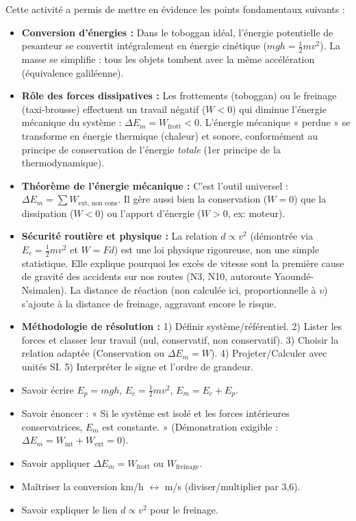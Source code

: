 \documentclass[11pt]{article}
\newcounter{popsec}
\newcounter{popsub}
\newcommand{\courssub}[1]{%
  \stepcounter{popsub}%
  \par\vspace{9pt}\noindent{\popxbold\fontsize{11.5}{13}\selectfont\color{popink}{\color{poporange}\thepopsec.\thepopsub}\hspace{6pt}#1}\par\nopagebreak\vspace{4pt}
}
\begin{document}
\courssub{Bilan de l'activité}
Cette activité a permis de mettre en évidence les points fondamentaux suivants :
\begin{itemize}
    \item \textbf{Conversion d'énergies :} Dans le toboggan idéal, l'énergie potentielle de pesanteur se convertit intégralement en énergie cinétique ($mgh = \frac{1}{2}mv^2$). La masse se simplifie : tous les objets tombent avec la même accélération (équivalence galiléenne).
    \item \textbf{Rôle des forces dissipatives :} Les frottements (toboggan) ou le freinage (taxi-brousse) effectuent un travail négatif ($W < 0$) qui diminue l'énergie mécanique du système : $\Delta E_m = W_{\text{frott}} < 0$. L'énergie mécanique « perdue » se transforme en énergie thermique (chaleur) et sonore, conformément au principe de conservation de l'énergie \emph{totale} (1er principe de la thermodynamique).
    \item \textbf{Théorème de l'énergie mécanique :} C'est l'outil universel : $\Delta E_m = \sum W_{\text{ext, non cons}}$. Il gère aussi bien la conservation ($W=0$) que la dissipation ($W<0$) ou l'apport d'énergie ($W>0$, ex: moteur).
    \item \textbf{Sécurité routière et physique :} La relation $d \propto v^2$ (démontrée via $E_c = \frac{1}{2}mv^2$ et $W = Fd$) est une loi physique rigoureuse, non une simple statistique. Elle explique pourquoi les excès de vitesse sont la première cause de gravité des accidents sur nos routes (N3, N10, autoroute Yaoundé-Nsimalen). La distance de réaction (non calculée ici, proportionnelle à $v$) s'ajoute à la distance de freinage, aggravant encore le risque.
    \item \textbf{Méthodologie de résolution :} 1) Définir système/référentiel. 2) Lister les forces et classer leur travail (nul, conservatif, non conservatif). 3) Choisir la relation adaptée (Conservation ou $\Delta E_m = W$). 4) Projeter/Calculer avec unités SI. 5) Interpréter le signe et l'ordre de grandeur.
\end{itemize}
\begin{aretenir}
\begin{itemize}
    \item Savoir écrire $E_p = mgh$, $E_c = \frac{1}{2}mv^2$, $E_m = E_c + E_p$.
    \item Savoir énoncer : « Si le système est isolé et les forces intérieures conservatrices, $E_m$ est constante. » (Démonstration exigible : $\Delta E_m = W_{\text{int}} + W_{\text{ext}} = 0$).
    \item Savoir appliquer $\Delta E_m = W_{\text{frott}}$ ou $W_{\text{freinage}}$.
    \item Maîtriser la conversion km/h $\leftrightarrow$ m/s (diviser/multiplier par 3,6).
    \item Savoir expliquer le lien $d \propto v^2$ pour le freinage.
\end{itemize}
\end{aretenir}
\end{document}
